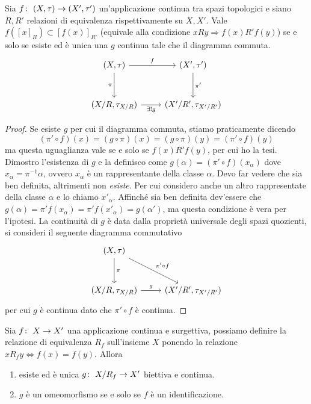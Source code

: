 \begin{lemma}
	\label{lem_qdom}
	Sia $f \colon\ (X, \tau) \rightarrow (X', \tau')$ un'applicazione continua tra spazi topologici e siano $R, R'$ relazioni di equivalenza rispettivamente su $X, X'$. Vale $f(\left[x\right]_R) \subset \left[f(x)\right]_{R'}$ (equivale alla condizione $xRy \Rightarrow f(x)R'f(y)$) se e solo se esiste ed è unica una $g$ continua tale che il diagramma commuta.
	\begin{equation*}
	\begin{tikzcd}[row sep = 3em]
		(X, \tau) \arrow[swap]{d}{\pi} \arrow{r}{f} & (X', \tau') \arrow{d}{\pi'}\\
		(X/R, \tau_{X/R}) \arrow[swap]{r}{\exists! g} & (X'/R', \tau_{X'/R'})
	\end{tikzcd}
	\end{equation*} 	
	
\end{lemma}
\begin{proof}
	Se esiste $g$ per cui il diagramma commuta, stiamo praticamente dicendo 
	\begin{equation*}
		(\pi' \circ f)(x) = (g \circ \pi)(x) = (g \circ \pi)(y) = (\pi' \circ f)(y)
	\end{equation*}
	ma questa uguaglianza vale se e solo se $f(x) R' f(y)$, per cui ho la tesi.\\
	
	Dimostro l'esistenza di $g$ e la definisco come $g(\alpha) = (\pi' \circ f)(x_\alpha)$ dove $x_\alpha = \pi^{-1}\alpha$, ovvero $x_\alpha$ è un rappresentante della classe $\alpha$. Devo far vedere che sia ben definita, altrimenti non \textit{esiste}.
	Per cui considero anche un altro rappresentate della classe $\alpha$ e lo chiamo $x'_\alpha$. Affinché sia ben definita dev'essere che $g(\alpha) = \pi'f(x_\alpha) = \pi' f(x'_\alpha) = g(\alpha')$, ma questa condizione è vera per l'ipotesi. La continuità di $g$ è data dalla proprietà universale degli spazi quozienti, si consideri il seguente diagramma commutativo
	\begin{equation*}
		\begin{tikzcd}[row sep = 3em]
			(X,\tau) \arrow{d}{\pi} \arrow{rd}{\pi' \circ f} & \\
			(X/R, \tau_{X/R}) \arrow{r}{g} & (X'/R', \tau_{X'/R'})
		\end{tikzcd}
	\end{equation*}
	per cui $g$ è continua dato che $\pi' \circ f$ è continua.
\end{proof}
\newpage
\begin{theorem}
	Sia  $f \colon\ X \rightarrow X'$ una applicazione continua e surgettiva, possiamo definire la relazione di equivalenza $R_f$ sull'insieme $X$ ponendo la relazione $xR_fy \Leftrightarrow f(x) = f(y)$. Allora 
	\begin{enumerate}
		\item esiste ed è unica $g \colon\ X/R_f \rightarrow X'$ biettiva e continua.
		\item $g$ è un omeomorfismo se e solo se $f$ è un identificazione.
	\end{enumerate}
\end{theorem}
